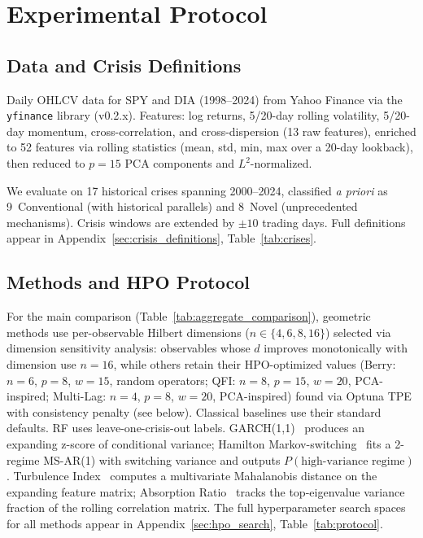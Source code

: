 \documentclass[3p]{elsarticle}
\begin{document}
\section{Experimental Protocol}\label{sec:protocol}

\subsection{Data and Crisis Definitions}\label{subsec:data}

Daily OHLCV data for SPY and DIA (1998--2024) from Yahoo Finance via the \texttt{yfinance} library (v0.2.x).
Features: log returns, 5/20-day rolling volatility, 5/20-day momentum,
cross-correlation, and cross-dispersion (13 raw features), enriched to
52 features via rolling statistics (mean, std, min, max over a
20-day lookback), then reduced to $p = 15$ PCA components and
$L^2$-normalized.

We evaluate on 17 historical crises spanning 2000--2024, classified
\emph{a priori} as 9~Conventional (with historical parallels) and
8~Novel (unprecedented mechanisms).  Crisis windows are extended by
$\pm 10$ trading days.  Full definitions appear in
Appendix~\ref{sec:crisis_definitions}, Table~\ref{tab:crises}.

\subsection{Methods and HPO Protocol}\label{subsec:methods_protocol}

For the main comparison (Table~\ref{tab:aggregate_comparison}),
geometric methods use per-observable Hilbert dimensions ($n \in \{4, 6, 8, 16\}$)
selected via dimension sensitivity analysis: observables whose $d$ improves
monotonically with dimension use $n = 16$, while others retain their
HPO-optimized values (Berry: $n = 6$, $p = 8$, $w = 15$, random operators;
QFI: $n = 8$, $p = 15$, $w = 20$, PCA-inspired; Multi-Lag: $n = 4$, $p = 8$,
$w = 20$, PCA-inspired) found via Optuna TPE with consistency penalty
(see below).  Classical baselines use
their standard defaults.  RF uses leave-one-crisis-out labels.
GARCH(1,1)~\cite{bollerslev1986} produces an expanding z-score of
conditional variance; Hamilton
Markov-switching~\cite{hamilton1989} fits a 2-regime MS-AR(1) with
switching variance and outputs $P(\text{high-variance regime})$.
Turbulence Index~\cite{chow1999} computes a multivariate Mahalanobis
distance on the expanding feature matrix; Absorption
Ratio~\cite{kritzman2011} tracks the top-eigenvalue variance fraction
of the rolling correlation matrix.
The full hyperparameter search spaces for all methods appear in
Appendix~\ref{sec:hpo_search}, Table~\ref{tab:protocol}.
\end{document}
